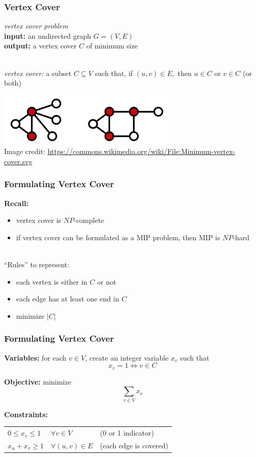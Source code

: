 \documentclass[10pt,aspectratio=169]{beamer}
\newcommand{\stanza}{ \\~\ }
\begin{document}
\begin{frame} \frametitle{Vertex Cover}
  \emph{vertex cover problem} \\
  \textbf{input:} an undirected graph $G=(V, E)$ \\
  \textbf{output:} a vertex cover $C$ of minimum size
  \stanza

  \emph{vertex cover:} a subset $C \subseteq V$ such that, if $(u, v) \in E,$ then $u \in C$ or $v \in C$ (or both)
 
  \begin{center}
    \includegraphics[height=1in]{vertex-cover.png} \\
    {\tiny Image credit: \url{https://commons.wikimedia.org/wiki/File:Minimum-vertex-cover.svg} }
  \end{center}

\end{frame}

\begin{frame} \frametitle{Formulating Vertex Cover}
  \textbf{Recall:}
  \begin{itemize}
    \item vertex cover is $NP$-complete
    \item if vertex cover can be formulated as a MIP problem, then MIP is $NP$-hard
    \stanza
  \end{itemize}

  ``Rules'' to represent:
    \begin{itemize}
      \item each vertex is either in $C$ or not
      \item each edge has at least one end in $C$
      \item minimize $|C|$
    \end{itemize}
\end{frame}

\begin{frame} \frametitle{Formulating Vertex Cover}
\textbf{Variables:} for each $v \in V$, create an integer variable $x_v$ such that
\[ x_v = 1 \Leftrightarrow v \in C \]

\textbf{Objective:} minimize
\[ \sum_{v \in V} x_v \]

\textbf{Constraints:}
\begin{tabular}{lll}
  $0 \leq x_v \leq 1$ & $\forall v \in V$ & (0 or 1 indicator) \\
  $x_u + x_v \geq 1$ & $\forall (u, v) \in E$ & (each edge is covered)
\end{tabular}

\end{frame}
\end{document}
